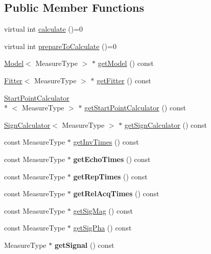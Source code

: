 \subsection*{Public Member Functions}
\begin{DoxyCompactItemize}
\item 
virtual int \hyperlink{class_ox_1_1_calculator_a9638894f2ec526b68f46f02122bae0c3}{calculate} ()=0
\item 
virtual int \hyperlink{class_ox_1_1_calculator_a01267c4e842b35f7eacaa9aacdd7e766}{prepare\-To\-Calculate} ()=0
\item 
\hyperlink{class_ox_1_1_model}{Model}$<$ Measure\-Type $>$ $\ast$ \hyperlink{class_ox_1_1_calculator_a5589bf7b93a2d1e106532c35745f4329}{get\-Model} () const 
\item 
\hyperlink{class_ox_1_1_fitter}{Fitter}$<$ Measure\-Type $>$ $\ast$ \hyperlink{class_ox_1_1_calculator_af648a7c6c957c9f51532f15c93147d62}{get\-Fitter} () const 
\item 
\hyperlink{class_ox_1_1_start_point_calculator}{Start\-Point\-Calculator}\\*
$<$ Measure\-Type $>$ $\ast$ \hyperlink{class_ox_1_1_calculator_ad43fbbb3e888e1fa73f95d872a963bac}{get\-Start\-Point\-Calculator} () const 
\item 
\hyperlink{class_ox_1_1_sign_calculator}{Sign\-Calculator}$<$ Measure\-Type $>$ $\ast$ \hyperlink{class_ox_1_1_calculator_a4ee7fdeb4009d2e433ef6a566768eb25}{get\-Sign\-Calculator} () const 
\item 
const Measure\-Type $\ast$ \hyperlink{class_ox_1_1_calculator_ab844b24dfedd27d52466203ec0c913fa}{get\-Inv\-Times} () const 
\item 
\hypertarget{class_ox_1_1_calculator_a6a46eb89732759c2544398f9a694f5c7}{const Measure\-Type $\ast$ {\bfseries get\-Echo\-Times} () const }\label{class_ox_1_1_calculator_a6a46eb89732759c2544398f9a694f5c7}

\item 
\hypertarget{class_ox_1_1_calculator_a2e708f33e09e1e08345bea3024e99ec1}{const Measure\-Type $\ast$ {\bfseries get\-Rep\-Times} () const }\label{class_ox_1_1_calculator_a2e708f33e09e1e08345bea3024e99ec1}

\item 
\hypertarget{class_ox_1_1_calculator_a6698aa9563e9c7d251d4ff73810dd12c}{const Measure\-Type $\ast$ {\bfseries get\-Rel\-Acq\-Times} () const }\label{class_ox_1_1_calculator_a6698aa9563e9c7d251d4ff73810dd12c}

\item 
const Measure\-Type $\ast$ \hyperlink{class_ox_1_1_calculator_ad9a623ee2bfc77732fa891c47c087aa9}{get\-Sig\-Mag} () const 
\item 
const Measure\-Type $\ast$ \hyperlink{class_ox_1_1_calculator_acf6021ef084c24636a344a12627caff5}{get\-Sig\-Pha} () const 
\item 
\hypertarget{class_ox_1_1_calculator_a10c8a3e18079c680cbdf54366d5dfed0}{Measure\-Type $\ast$ {\bfseries get\-Signal} () const }\label{class_ox_1_1_calculator_a10c8a3e18079c680cbdf54366d5dfed0}


\end{DoxyCompactItemize}

